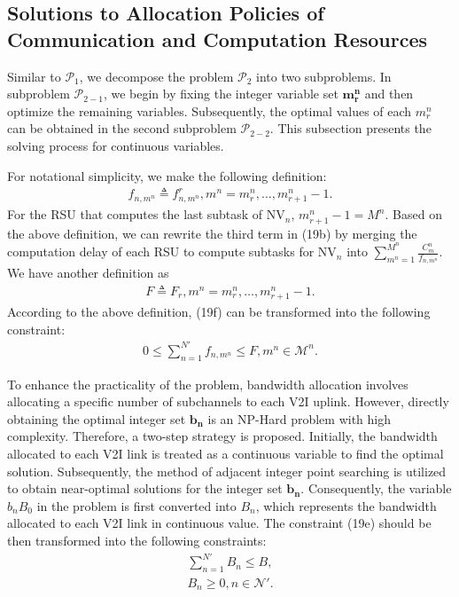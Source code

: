 \documentclass[lettersize,journal]{IEEEtran}
\begin{document}
\subsection{Solutions to Allocation Policies of Communication and Computation Resources}
Similar to $\mathcal{P}_1$, we decompose the problem $\mathcal{P}_2$ into two subproblems. In subproblem $\mathcal{P}_{2-1}$, we begin by fixing the integer variable set $\mathbf{m_r^n}$ and then optimize the remaining variables. Subsequently, the optimal values of each $m^n_r$ can be obtained in the second subproblem $\mathcal{P}_{2-2}$. This subsection presents the solving process for continuous variables.

For notational simplicity, we make the following definition:
\begin{align*}
f_{n,m^n} \triangleq f^{r}_{n,m^n}, m^n=m^n_r,\ldots, m^n_{r+1}-1. \tag{20}\end{align*}
For the RSU that computes the last subtask of NV$_n$, $m^n_{r+1}-1=M^n$. Based on the above definition, we can rewrite the third term in (19b) by merging the computation delay of each RSU to compute subtasks for NV$_n$ into $\sum_{m^n=1}^{M^n}\frac{C^n_m}{f_{n,m^n}}$. We have another definition as
\begin{align*}
F \triangleq F_r, m^n= m^n_r, \ldots, m^n_{r+1}-1.\tag{21}\end{align*} 
According to the above definition, (19f) can be transformed into the following constraint:
\begin{align*}
0 \leq \sum_{n=1}^{N'} f_{n,m^n} \leq F, m^n \in \mathcal{M}^n. \tag{22}\end{align*} 


To enhance the practicality of the problem, bandwidth allocation involves allocating a specific number of subchannels to each V2I uplink. However, directly obtaining the optimal integer set $\mathbf{b_n}$ is an NP-Hard problem with high complexity. Therefore, a two-step strategy is proposed. Initially, the bandwidth allocated to each V2I link is treated as a continuous variable to find the optimal solution. Subsequently, the method of adjacent integer point searching is utilized to obtain near-optimal solutions for the integer set $\mathbf{b_n}$. Consequently, the variable $b_n B_0$ in the problem is first converted into $B_n$, which represents the bandwidth allocated to each V2I link in continuous value. The constraint (19e) should be then transformed into the following constraints:
\begin{align*}
\sum_{n=1}^{N'} B_n \leq B, \tag{23a} \\
B_n \geq 0, n \in \mathcal{N'}. \tag{23b} \\
\end{align*}
\end{document}
